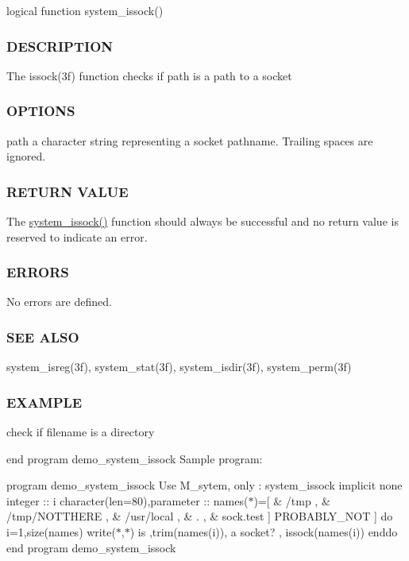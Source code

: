 \begin{DoxyVerb}logical function system_issock()
\end{DoxyVerb}


\subsubsection*{D\+E\+S\+C\+R\+I\+P\+T\+I\+ON}

The issock(3f) function checks if path is a path to a socket

\subsubsection*{O\+P\+T\+I\+O\+NS}

path a character string representing a socket pathname. Trailing spaces are ignored.

\subsubsection*{R\+E\+T\+U\+RN V\+A\+L\+UE}

The \hyperlink{namespacem__system_af6eb5074fe74552bc7a5e7d00f459087}{system\+\_\+issock()} function should always be successful and no return value is reserved to indicate an error.

\subsubsection*{E\+R\+R\+O\+RS}

No errors are defined.

\subsubsection*{S\+EE A\+L\+SO}

system\+\_\+isreg(3f), system\+\_\+stat(3f), system\+\_\+isdir(3f), system\+\_\+perm(3f)

\subsubsection*{E\+X\+A\+M\+P\+LE}

check if filename is a directory

end program demo\+\_\+system\+\_\+issock Sample program\+:

program demo\+\_\+system\+\_\+issock Use M\+\_\+sytem, only \+: system\+\_\+issock implicit none integer \+:\+: i character(len=80),parameter \+:\+: names($\ast$)=\mbox{[} \& \textquotesingle{}/tmp \textquotesingle{}, \& \textquotesingle{}/tmp/\+N\+O\+T\+T\+H\+E\+RE \textquotesingle{}, \& \textquotesingle{}/usr/local \textquotesingle{}, \& \textquotesingle{}. \textquotesingle{}, \& \textquotesingle{}sock.\+test \textquotesingle{}\mbox{]} \textquotesingle{}P\+R\+O\+B\+A\+B\+L\+Y\+\_\+\+N\+OT \textquotesingle{}\mbox{]} do i=1,size(names) write($\ast$,$\ast$)\textquotesingle{} is \textquotesingle{},trim(names(i)),\textquotesingle{} a socket? \textquotesingle{}, issock(names(i)) enddo end program demo\+\_\+system\+\_\+issock


